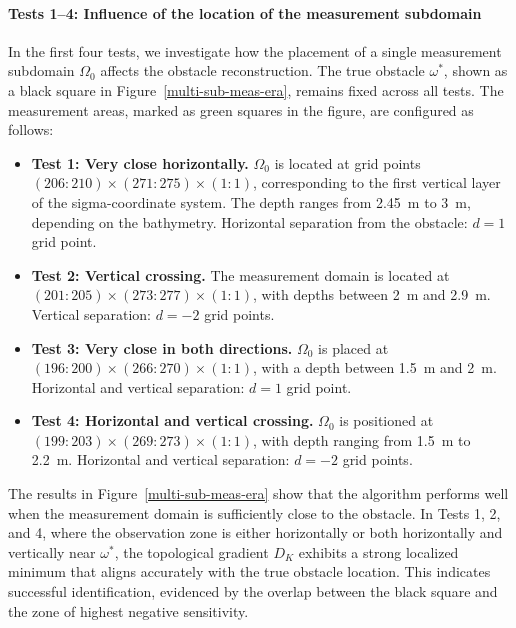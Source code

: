 \documentclass[a4paper,12pt,reqno,natbib]{amsart}
\begin{document}
\vspace{0.3cm}
\paragraph{\textbf{Tests 1–4: Influence of the location of the measurement subdomain}}  
In the first four tests, we investigate how the placement of a single measurement subdomain \( \Omega_0 \) affects the obstacle reconstruction. The true obstacle \( \omega^* \), shown as a black square in Figure~\ref{multi-sub-meas-era}, remains fixed across all tests. The measurement areas, marked as green squares in the figure, are configured as follows:

\begin{itemize}
    \item \textbf{Test 1: Very close horizontally.}  
    \( \Omega_0 \) is located at grid points \( (206{:}210) \times (271{:}275) \times (1{:}1) \), corresponding to the first vertical layer of the sigma-coordinate system. The depth ranges from 2.45~m to 3~m, depending on the bathymetry.  
    Horizontal separation from the obstacle: \( d = 1 \) grid point.

    \item \textbf{Test 2: Vertical crossing.}  
    The measurement domain is located at \( (201{:}205) \times (273{:}277) \times (1{:}1) \), with depths between 2~m and 2.9~m.  
    Vertical separation: \( d = -2 \) grid points.

    \item \textbf{Test 3: Very close in both directions.}  
    \( \Omega_0 \) is placed at \( (196{:}200) \times (266{:}270) \times (1{:}1) \), with a depth between 1.5~m and 2~m.  
    Horizontal and vertical separation: \( d = 1 \) grid point.

    \item \textbf{Test 4: Horizontal and vertical crossing.}  
    \( \Omega_0 \) is positioned at \( (199{:}203) \times (269{:}273) \times (1{:}1) \), with depth ranging from 1.5~m to 2.2~m.  
    Horizontal and vertical separation: \( d = -2 \) grid points.
\end{itemize}

\noindent The results in Figure~\ref{multi-sub-meas-era} show that the algorithm performs well when the measurement domain is sufficiently close to the obstacle. In Tests 1, 2, and 4, where the observation zone is either horizontally or both horizontally and vertically near \( \omega^* \), the topological gradient \( D_K \) exhibits a strong localized minimum that aligns accurately with the true obstacle location. This indicates successful identification, evidenced by the overlap between the black square and the zone of highest negative sensitivity.
\end{document}
